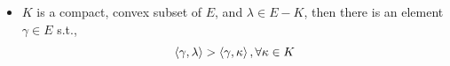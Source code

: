 \begin{itemize}
	\begin{figure}[H]
		\centering
	\end{figure}
	
	\begin{itemize}
		\item $K$ is a compact, convex subset of $E$, and $\lambda \in E - K$, then there is an element $\gamma \in E$ s.t.,
		\begin{equation}
			\braket{\gamma, \lambda} > \braket{\gamma, \kappa}, \forall \kappa \in K
		\end{equation}
		

\end{itemize}
\end{itemize}
